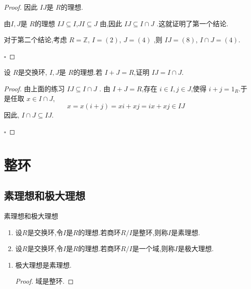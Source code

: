\documentclass[lang=cn,12pt,color=green,fontset=none,pad]{elegantbook}
\begin{document}
\begin{problemset}
\begin{proof}
            因此 \(  I J  \)是 \(  R  \)的理想.

            由\(  I ,J \)是 \(  R  \)的理想   \(  I J  \subseteq  I\),\(  J I\subseteq J  \) 由,因此 \(  I J\subseteq  I \cap  J  \)  .这就证明了第一个结论.


            对于第二个结论,考虑 \(  R =  \mathbb{Z}   \),  \(  I =  \left( 2 \right)   \), \(  J = \left(  4 \right)   \)  ,则 \(  I J=  \left( 8 \right)   \), \(  I \cap J= \left( 4 \right)    \).  
        
            \hfill $\square$
        \end{proof}


        \item 设 \(  R  \)是交换环, \(  I,J  \)是 \(  R  \)的理想.若 \(  I+ J = R  \),证明 \(  I J =  I \cap J  \).
        \begin{proof}

            由上面的练习 \(  I J \subseteq I \cap J  \) .
            由 \(  I + J=  R  \),存在 \(  i \in  I,j \in J  \),使得 \(  i+ j =  1_{R}  \).于是任取 \(  x \in  I\cap J  \), \[
            x =  x\left( i+ j \right) =  xi +  xj   =  ix + xj \in  I J
            \]    因此, \(  I \cap J \subseteq I J \). 
        
            \hfill $\square$
        \end{proof}     
\end{problemset}



\chapter{整环}


\section{素理想和极大理想}

\begin{definition}{素理想和极大理想}
    \begin{enumerate}
        \item 设$R$是交换环,令$I$是$R$的理想.若商环$R/I$是整环,则称$I$是素理想.
        \item 设$R$是交换环,令$I$是$R$的理想.若商环$R/I$是一个域,则称$I$是极大理想.
    \end{enumerate}
    
\end{definition}
\begin{remark}
    \begin{enumerate}
        \item 极大理想是素理想.
        \begin{proof}
            域是整环.
        \end{proof}
    \end{enumerate}
    
\end{remark}
\end{document}
